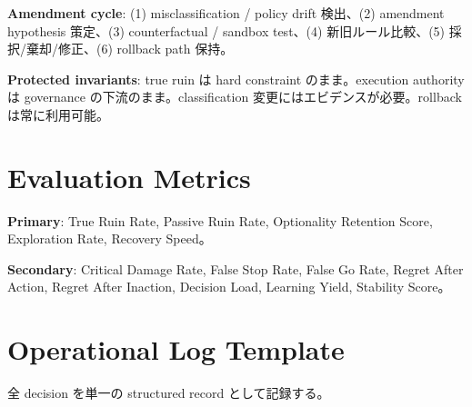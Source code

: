 \documentclass[11pt,a4paper]{article}
\theoremstyle{definition}\newtheorem{definition}{Definition}[section]
\begin{document}
\textbf{Amendment cycle}: (1) misclassification / policy drift 検出、(2) amendment hypothesis 策定、(3) counterfactual / sandbox test、(4) 新旧ルール比較、(5) 採択/棄却/修正、(6) rollback path 保持。

\textbf{Protected invariants}: true ruin は hard constraint のまま。execution authority は governance の下流のまま。classification 変更にはエビデンスが必要。rollback は常に利用可能。


\section{Evaluation Metrics}

\textbf{Primary}: True Ruin Rate, Passive Ruin Rate, Optionality Retention Score, Exploration Rate, Recovery Speed。

\textbf{Secondary}: Critical Damage Rate, False Stop Rate, False Go Rate, Regret After Action, Regret After Inaction, Decision Load, Learning Yield, Stability Score。


\section{Operational Log Template}

全 decision を単一の structured record として記録する。
\end{document}
